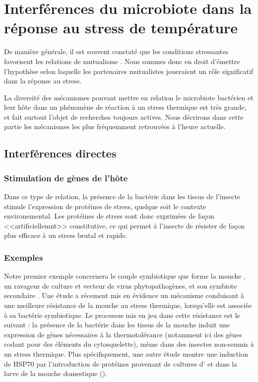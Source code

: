 \chapter{Interférences du microbiote dans la réponse au stress de température} %
	\label{sec:implicationµbiote}

De manière générale, il est souvent constaté que les conditions stressantes favorisent les relations de mutualisme \cite{meadows2013}.
Nous sommes donc en droit d'émettre l'hypothèse selon laquelle les partenaires mutualistes joueraient un rôle significatif dans la réponse au stress.

La diversité des mécanismes pouvant mettre en relation le microbiote bactérien
et leur hôte dans un phénomène de réaction à un stress thermique est très
grande, et fait surtout l'objet de recherches toujours actives. Nous décrirons
dans cette partie les mécanismes les plus fréquemment retrouvées à l'heure
actuelle.


	\section{Interférences directes} %
		\label{sec:direct}

\subsection{Stimulation de gènes de l'hôte} %
\label{sub:genes_hote}

Dans ce type de relation, la présence de la bactérie dans les tissus de
l'insecte stimule l'expression de protéines de stress, quelque soit le
contexte environemental. Les protéines de stress sont donc exprimées de façon
<<artificiellemnt>> constitutive, ce qui permet à l'insecte de résister de façon
plus efficace à un stress brutal et rapide.

\subsection{Exemples} %
\label{sub:exemples}


Notre premier exemple concernera le couple symbiotique que forme la mouche
, un ravageur de culture et vecteur de virus
phytopathogènes, et son symbiote secondaire . Une étude
\cite{brumin2011} a récement mis en évidence un mécanisme conduisant à une
meilleure résistance de la mouche au stress thermique, lorsqu'elle est
associée à sa bactérie symbiotique. Le processus mis en jeu dans cette
résistance est le suivant : la
présence de la bactérie dans les tissus de la mouche induit une expression de
gènes nécessaires à la thermotolérance (notamment ici des gènes codant pour
des éléments du cytosquelette), même dans des insectes non-soumis à un stress
thermique.
Plus spécifiquement, une autre étude \cite{tang2012} montre une induction de HSP70 par l'introduction de protéines provenant de cultures d' et  dans la larve de la mouche domestique ().

